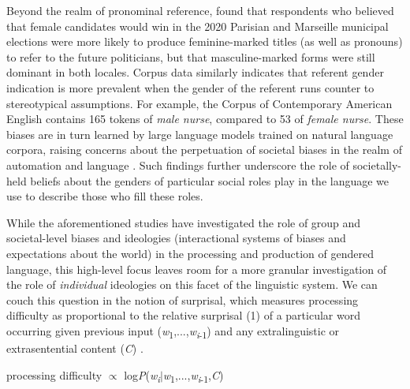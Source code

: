 \documentclass[10pt,letterpaper]{article}
\begin{document}
	Beyond the realm of pronominal reference, \textcite{pozniak2021failures} found that respondents who believed that female candidates would win in the 2020 Parisian and Marseille municipal elections were more likely to produce feminine-marked titles (as well as pronouns) to refer to the future politicians, but that masculine-marked forms were still dominant in both locales. Corpus data similarly indicates that referent gender indication is more prevalent when the gender of the referent runs counter to stereotypical assumptions. For example, the Corpus of Contemporary American English \parencite{coca} contains 165 tokens of \textit{male nurse}, compared to 53 of \textit{female nurse}. These biases are in turn learned by large language models trained on natural language corpora, raising concerns about the perpetuation of societal biases in the realm of automation and language \parencite{caliskan2017semantics,bender2021dangers,sutton2018biased}. Such findings further underscore the role of societally-held beliefs about the genders of particular social roles play in the language we use to describe those who fill these roles.\par 
	While the aforementioned studies have investigated the role of group and societal-level biases and ideologies (interactional systems of biases and expectations about the world) in the processing and production of gendered language, this high-level focus leaves room for a more granular investigation of the role of \textit{individual} ideologies on this facet of the linguistic system. We can couch this question in the notion of surprisal, which measures processing difficulty as proportional to the relative surprisal (1) of a particular word occurring given previous input (\textit{w}\textsubscript{1},...,\textit{w}\textsubscript{\textit{i}-1}) and any extralinguistic or extrasentential content (\textit{C}) \parencite{levy2008expectation}.
	
	\begin{exe}
		\item processing difficulty $\propto$ log\textit{P}(\textit{w}\textsubscript{\textit{i}}$|$\textit{w}\textsubscript{1},...,\textit{w}\textsubscript{\textit{i}-1},\textit{C})
	\end{exe}
	
\end{document}
